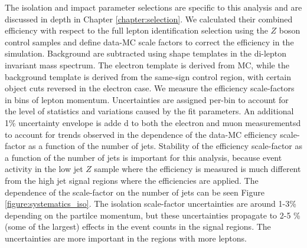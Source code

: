 The isolation and impact parameter selections are specific to this analysis and are discussed in depth in Chapter \ref{chapter:selection}. We calculated their combined efficiency with respect to the full lepton identification selection using the $Z$ boson control samples and define data-MC scale factors to correct the efficiency in the simulation. Background are subtracted using shape templates in the di-lepton invariant mass spectrum. The electron template is derived from MC, while the background template is derived from the same-sign control region, with certain object cuts reversed in the electron case. We measure the efficiency scale-factors in bins of lepton momentum. Uncertainties are assigned per-bin to account for the level of statistics and variations caused by the fit parameters. An additional 1\% uncertainty envelope is adde d to both the electron and muon measurementsd to account for trends observed in the dependence of the data-MC efficiency scale-factor as a function of the number of jets. Stability of the efficiency scale-factor as a function of the number of jets is important for this analysis, because event activity in the low jet $Z$ sample where the efficiency is measured is much different from the high jet signal regions where the efficiencies are applied. The dependence of the scale-factor on the number of jets can be seen Figure \ref{figure:systematics_iso}. The isolation scale-factor uncertainties are around 1-3\% depending on the partilce momentum, but these uncertainties propagate to 2-5 \% (some of the largest) effects in the event counts in the signal regions. The uncertainties are more important in the regions with more leptons. 



